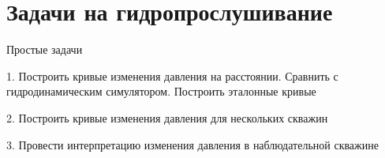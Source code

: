 \section{Задачи на гидропрослушивание}

Простые задачи 

1. Построить кривые изменения давления на расстоянии. Сравнить с гидродинамическим симулятором. Построить эталонные кривые

2. Построить кривые изменения давления для нескольких скважин

3. Провести интерпретацию изменения давления в наблюдательной скважине